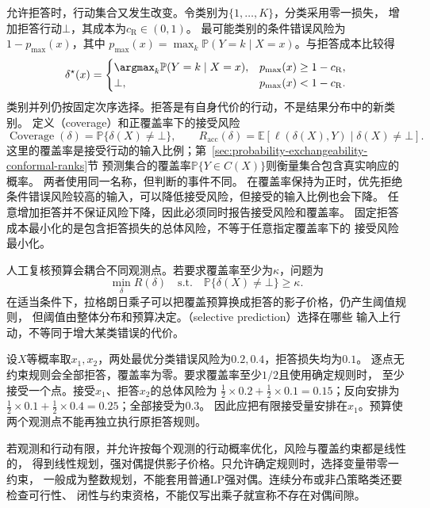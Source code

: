 允许拒答时，行动集合又发生改变。令类别为$\{1,\ldots,K\}$，分类采用零一损失，
增加拒答行动$\bot$，其成本为$c_{\mathrm R}\in(0,1)$。
最可能类别的条件错误风险为$1-p_{\max}(x)$，其中
$p_{\max}(x)=\max_k\mathbb P(Y=k\mid X=x)$。与拒答成本比较得
\begin{equation}
  \delta^\star(x)=
  \begin{cases}
    \argmax_k\mathbb P(Y=k\mid X=x),&p_{\max}(x)\geq1-c_{\mathrm R},\\
    \bot,&p_{\max}(x)<1-c_{\mathrm R}.
  \end{cases}
  \label{eq:decision-reject-rule}
\end{equation}
类别并列仍按固定次序选择。拒答是有自身代价的行动，不是结果分布中的新类别。
定义（coverage）和正覆盖率下的接受风险
\[
  \operatorname{Coverage}(\delta)=\mathbb P\{\delta(X)\neq\bot\},\qquad
  R_{\mathrm{acc}}(\delta)
  =\mathbb E[\ell(\delta(X),Y)\mid\delta(X)\neq\bot].
\]
这里的覆盖率是接受行动的输入比例；第~\ref{sec:probability-exchangeability-conformal-ranks}节
预测集合的覆盖率$\mathbb P\{Y\in C(X)\}$则衡量集合包含真实响应的概率。
两者使用同一名称，但判断的事件不同。
在覆盖率保持为正时，优先拒绝条件错误风险较高的输入，可以降低接受风险，但接受的输入比例也会下降。
任意增加拒答并不保证风险下降，因此必须同时报告接受风险和覆盖率。
固定拒答成本最小化的是包含拒答损失的总体风险，不等于任意指定覆盖率下的
接受风险最小化。

人工复核预算会耦合不同观测点。若要求覆盖率至少为$\kappa$，问题为
\[
  \min_\delta R(\delta)
  \quad\text{s.t.}\quad\mathbb P\{\delta(X)\neq\bot\}\geq\kappa.
\]
在适当条件下，拉格朗日乘子可以把覆盖预算换成拒答的影子价格，仍产生阈值规则，
但阈值由整体分布和预算决定。（selective prediction）选择在哪些
输入上行动，不等同于增大某类错误的代价。

\begin{example}[覆盖预算耦合两个观测点]
\label{ex:decision-two-point-coverage-budget}
设$X$等概率取$x_1,x_2$，两处最优分类错误风险为$0.2,0.4$，拒答损失均为$0.1$。
逐点无约束规则会全部拒答，覆盖率为零。要求覆盖率至少$1/2$且使用确定规则时，
至少接受一个点。接受$x_1$、拒答$x_2$的总体风险为
$\tfrac12\times0.2+\tfrac12\times0.1=0.15$；反向安排为
$\tfrac12\times0.1+\tfrac12\times0.4=0.25$；全部接受为$0.3$。
因此应把有限接受量安排在$x_1$。预算使两个观测点不能再独立执行原拒答规则。
\end{example}

若观测和行动有限，并允许按每个观测的行动概率优化，风险与覆盖约束都是线性的，
得到线性规划，强对偶提供影子价格。只允许确定规则时，选择变量带零一约束，
一般成为整数规划，不能套用普通LP强对偶。连续分布或非凸策略类还要检查可行性、
闭性与约束资格，不能仅写出乘子就宣称不存在对偶间隙。

